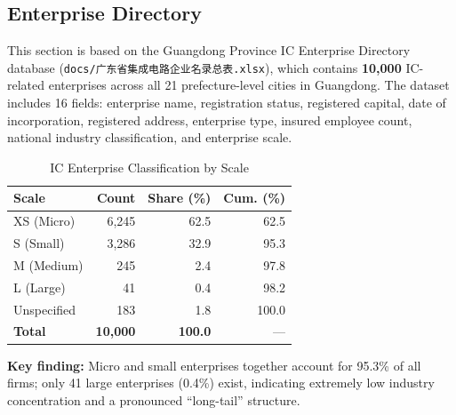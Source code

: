 \documentclass[12pt,a4paper]{article}
\newcommand{\tableHeaderRow}{\rowcolor{tealPrimary}\color{white}}
\newcommand{\tableOddRow}{\rowcolor{mintBG}}
\newcommand{\tableEvenRow}{\rowcolor{white}}
\begin{document}
\subsection{Enterprise Directory}
\label{sec:enterprises}

This section is based on the Guangdong Province IC Enterprise Directory database
(\texttt{docs/广东省集成电路企业名录总表.xlsx}), which contains \textbf{10,000} IC-related
enterprises across all 21 prefecture-level cities in Guangdong. The dataset includes
16 fields: enterprise name, registration status, registered capital, date of incorporation,
registered address, enterprise type, insured employee count, national industry classification,
and enterprise scale.

\begin{table}[H]
\centering
\caption{IC Enterprise Classification by Scale}
\label{tab:scale}
\begin{tabular}{lrrr}
\toprule
\tableHeaderRow
\textbf{Scale} & \textbf{Count} & \textbf{Share (\%)} & \textbf{Cum. (\%)} \\
\midrule
\tableOddRow  XS (Micro)   & 6,245 & 62.5 & 62.5 \\
\tableEvenRow S (Small)    & 3,286 & 32.9 & 95.3 \\
\tableOddRow  M (Medium)   & 245   & 2.4  & 97.8 \\
\tableEvenRow L (Large)    & 41    & 0.4  & 98.2 \\
\tableOddRow  Unspecified  & 183   & 1.8  & 100.0 \\
\midrule
\tableEvenRow \textbf{Total} & \textbf{10,000} & \textbf{100.0} & --- \\
\bottomrule
\end{tabular}
\end{table}

\textbf{Key finding:} Micro and small enterprises together account for 95.3\% of all firms;
only 41 large enterprises (0.4\%) exist, indicating extremely low industry concentration
and a pronounced ``long-tail'' structure.
\end{document}
